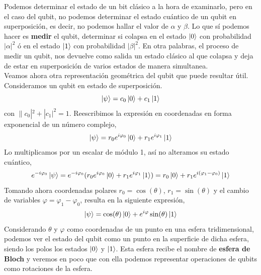 \documentclass[a4paper]{article}
\numberwithin{equation}{section}
\begin{document}
Podemos determinar el estado de un bit clásico a la hora de examinarlo, pero en el caso del qubit, no podemos determinar el estado cuántico de un qubit en superposición, es decir, no podemos hallar el valor de $\alpha$ y $\beta$. Lo que sí podemos hacer es \textbf{medir} el qubit, determinar si colapsa en el estado $\ket{0}$ con probabilidad $|\alpha|^2$ ó en el estado $\ket{1}$ con probabilidad $|\beta|^2$. En otra palabras, el proceso de medir un qubit, nos devuelve como salida un estado clásico al que colapsa y deja de estar en superposición de varios estados de manera simultanea.\\
\linebreak
Veamos ahora otra representación geométrica del qubit que puede resultar útil. Consideramos un qubit en estado de superposición.
\begin{equation}
\ket{\psi} = c_0\ket{0} + c_1\ket{1} 
\end{equation}
con $\|c_0|^2 + |c_1|^2 = 1$. Reescribimos la expresión en coordenadas en forma exponencial de un número complejo,
\begin{equation}
\ket{\psi} = r_0 e^{i\varphi_0}\ket{0} + r_1 e^{i\varphi_1}\ket{1}
\end{equation}
Lo multiplicamos por un escalar de módulo 1, así no alteramos su estado cuántico,
\begin{equation}
e^{-i\varphi_0}\ket{\psi} = e^{-i\varphi_0}(r_0 e^{i\varphi_0}\ket{0} + r_1 e^{i\varphi_1}\ket{1}) = 
r_0\ket{0} + r_1 e^{i(\varphi_1 - \varphi_0)}\ket{1}
\end{equation}
Tomando ahora coordenadas polares $r_0 = \cos(\theta)$, $r_1 = \sin(\theta)$ y el cambio de variables $\varphi = \varphi_1 - \varphi_0$, resulta en la siguiente expresión,
\begin{equation}
\ket{\psi} = \cos(\theta)\ket{0} + e^{i\varphi}\sin(\theta)\ket{1}
\end{equation}
Considerando $\theta$ y $\varphi$ como coordenadas de un punto en una esfera tridimensional, podemos ver el estado del qubit como un punto en la superficie de dicha esfera, siendo los polos los estados $\ket{0}$ y $\ket{1}$. Esta esfera recibe el nombre de \textbf{esfera de Bloch} y veremos en poco que con ella podemos representar operaciones de qubits como rotaciones de la esfera.
\end{document}
